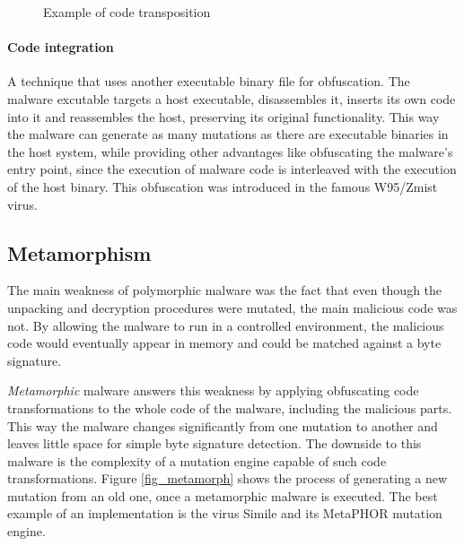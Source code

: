 \begin{figure}[H]
    \centering
    \caption{Example of code transposition}
    \label{fig_obf_trans}
\end{figure}

\paragraph*{Code integration}
A technique that uses another executable binary file for obfuscation. The malware excutable targets a host executable, disassembles it, inserts its own code into it and reassembles the host, preserving its original functionality. This way the malware can generate as many mutations as there are executable binaries in the host system, while providing other advantages like obfuscating the malware's entry point, since the execution of malware code is interleaved with the execution of the host binary. This obfuscation was introduced in the famous W95/Zmist virus.

\subsection{Metamorphism}
The main weakness of polymorphic malware was the fact that even though the unpacking and decryption procedures were mutated, the main malicious code was not. By allowing the malware to run in a controlled environment, the malicious code would eventually appear in memory and could be matched against a byte signature.

\emph{Metamorphic} malware answers this weakness by applying obfuscating code transformations to the whole code of the malware, including the malicious parts. This way the malware changes significantly from one mutation to another and leaves little space for simple byte signature detection. The downside to this malware is the complexity of a mutation engine capable of such code transformations. Figure \ref{fig_metamorph} shows the process of generating a new mutation from an old one, once a metamorphic malware is executed. The best example of an implementation is the virus Simile and its MetaPHOR mutation engine.

